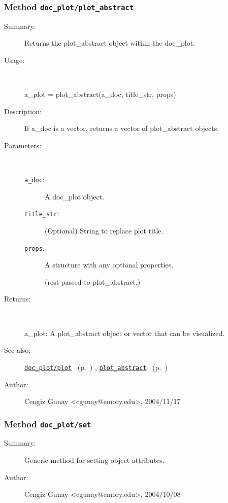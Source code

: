 \subsubsection[Method \texttt{plot\_abstract}]{Method \texttt{doc\_plot/plot\_abstract}}%
%
\label{ref_doc_plot__plot_abstract}%
\hypertarget{ref_doc_plot__plot_abstract}{}%
\begin{description}
\item[Summary:]Returns the plot\_abstract object within the doc\_plot.
%
\item[Usage:]~%
\begin{lyxcode}%
a\_plot = plot\_abstract(a\_doc, title\_str, props)
%
\end{lyxcode}%
%
\item[Description:]%
If a\_doc is a vector, returns a vector of plot\_abstract objects.
\item[Parameters:]~
\begin{description}%
\item[\texttt{a\_doc}:]
 A doc\_plot object.
\item[\texttt{title\_str}:]
 (Optional) String to replace plot title.
\item[\texttt{props}:]
 A structure with any optional properties.

(rest passed to plot\_abstract.)
\end{description}%
%
\item[Returns:
]~

	a\_plot: A plot\_abstract object or vector that can be visualized.
%
%
\item[See also:]%
\hyperlink{ref_doc_plot__plot}{\texttt{doc\_plot/plot}}%
\ (p.~\pageref{ref_doc_plot__plot})%
%
, \hyperlink{ref_plot_abstract}{\texttt{plot\_abstract}}%
\ (p.~\pageref{ref_plot_abstract})%
%
%
\item[Author:]%
Cengiz Gunay <cgunay@emory.edu>, 2004/11/17
%
\end{description}
\methodline%
\subsubsection[Method \texttt{set}]{Method \texttt{doc\_plot/set}}%
%
\label{ref_doc_plot__set}%
\hypertarget{ref_doc_plot__set}{}%
\begin{description}
\item[Summary:]Generic method for setting object attributes.
%
%
%
%
%
%
%
\item[Author:]%
Cengiz Gunay <cgunay@emory.edu>, 2004/10/08
%
\end{description}
\methodline%

